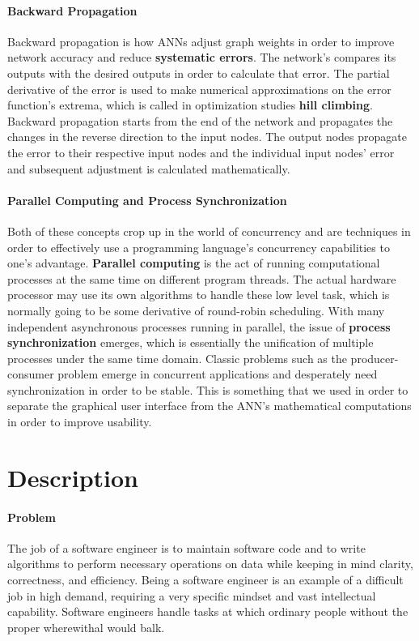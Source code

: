 \documentclass[letterpaper, 10pt]{article}
\begin{document}
	\paragraph{Backward Propagation}
	Backward propagation is how ANNs adjust graph weights in order to improve network accuracy and reduce \textbf{systematic errors}. The network's compares its outputs with the desired outputs in order to calculate that error. The partial derivative of the error is used to make numerical approximations on the error function's extrema, which is called in optimization studies \textbf{hill climbing}. Backward propagation starts from the end of the network and propagates the changes in the reverse direction to the input nodes. The output nodes propagate the error to their respective input nodes and the individual input nodes' error and subsequent adjustment is calculated mathematically.
	\paragraph{Parallel Computing and Process Synchronization}
	Both of these concepts crop up in the world of concurrency and are techniques in order to effectively use a programming language's concurrency capabilities to one's advantage. \textbf{Parallel computing} is the act of running computational processes at the same time on different program threads. The actual hardware processor may use its own algorithms to handle these low level task, which is normally going to be some derivative of round-robin scheduling. With many independent asynchronous processes running in parallel, the issue of \textbf{process synchronization} emerges, which is essentially the unification of multiple processes under the same time domain. Classic problems such as the producer-consumer problem emerge in concurrent applications and desperately need synchronization in order to be stable. This is something that we used in order to separate the graphical user interface from the ANN's mathematical computations in order to improve usability.
	
\cleardoublepage
\section{Description}
	\paragraph{Problem} The job of a software engineer is to maintain software code and to write algorithms to perform necessary operations on data while keeping in mind clarity, correctness, and efficiency. Being a software engineer is an example of a difficult job in high demand, requiring a very specific mindset and vast intellectual capability. Software engineers handle tasks at which ordinary people without the proper wherewithal would balk.
	
\end{document}
